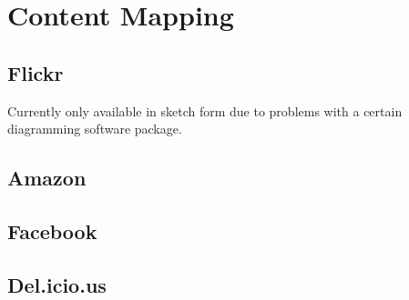 \chapter{Content Mapping}

\label{appendix:content.mapping}

\section{Flickr}

Currently only available in sketch form due to problems with a certain
diagramming software package.

\section{Amazon}

\section{Facebook}

\section{Del.icio.us}
